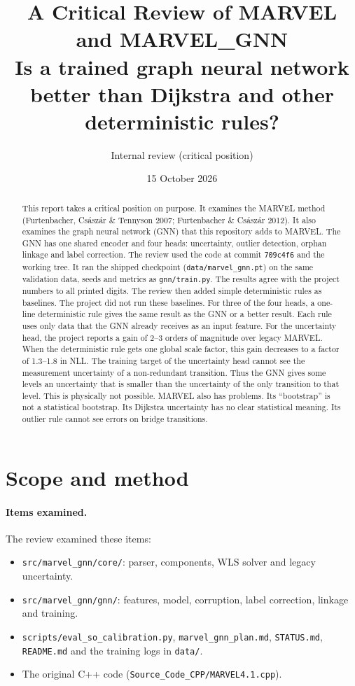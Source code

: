\documentclass[11pt,a4paper]{article}
\title{A Critical Review of MARVEL and \textsc{MARVEL\_GNN}\\[4pt]
\large Is a trained graph neural network better than Dijkstra and other deterministic rules?}
\author{Internal review (critical position)}
\date{15 October 2026}
\newcommand{\code}[1]{\texttt{#1}}
\begin{document}
\maketitle

\begin{abstract}
\noindent
This report takes a critical position on purpose. It examines the MARVEL method
(Furtenbacher, Cs\'asz\'ar \& Tennyson 2007; Furtenbacher \& Cs\'asz\'ar 2012). It
also examines the graph neural network (GNN) that this repository adds to MARVEL.
The GNN has one shared encoder and four heads: uncertainty, outlier detection, orphan
linkage and label correction.
The review used the code at commit \code{709c4f6} and the working tree. It ran the
shipped checkpoint (\code{data/marvel\_gnn.pt}) on the same validation data, seeds and
metrics as \code{gnn/train.py}. The results agree with the project numbers to all
printed digits. The review then added simple deterministic rules as baselines. The
project did not run these baselines.
For three of the four heads, a one-line deterministic rule gives the same result as
the GNN or a better result. Each rule uses only data that the GNN already receives as
an input feature. For the uncertainty head, the project reports a gain of 2--3
orders of magnitude over legacy MARVEL. When the deterministic rule gets one global
scale factor, this gain decreases to a factor of 1.3--1.8 in NLL.
The training target of the uncertainty head cannot see the measurement uncertainty
of a non-redundant transition. Thus the GNN gives some levels an uncertainty that is
smaller than the uncertainty of the only transition to that level. This is
physically not possible.
MARVEL also has problems. Its ``bootstrap'' is not a statistical bootstrap. Its
Dijkstra uncertainty has no clear statistical meaning. Its outlier rule cannot see
errors on bridge transitions.
\end{abstract}

\tableofcontents
\bigskip

\section{Scope and method}

\paragraph{Items examined.}
The review examined these items:
\begin{itemize}
\item \code{src/marvel\_gnn/core/}: parser, components, WLS solver and legacy
  uncertainty.
\item \code{src/marvel\_gnn/gnn/}: features, model, corruption, label correction,
  linkage and training.
\item \code{scripts/eval\_so\_calibration.py}, \code{marvel\_gnn\_plan.md},
  \code{STATUS.md}, \code{README.md} and the training logs in \code{data/}.
\item The original C++ code (\code{Source\_Code\_CPP/MARVEL4.1.cpp}).
\end{itemize}
\end{document}
